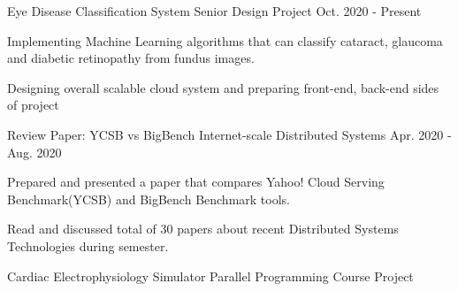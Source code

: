 
\begin{cventries}

  \cvopenentry
   {Eye Disease Classification System} %
    {Senior Design Project} %
    {} %
    {Oct. 2020 - Present} %
    {
      \begin{cvitems} %
      	\item {Implementing Machine Learning algorithms that can classify cataract, glaucoma and diabetic retinopathy from fundus images.}
      	\item {Designing overall scalable cloud system and preparing front-end, back-end sides of project  }
      \end{cvitems}
    }
\cvopenentry
   {Review Paper: YCSB vs BigBench} %
    {Internet-scale Distributed Systems} %
    {} %
    {Apr. 2020 - Aug. 2020} %
    {
      \begin{cvitems} %
        \item {Prepared and presented a paper that compares Yahoo! Cloud Serving Benchmark(YCSB) and         BigBench Benchmark tools.}
      	\item {Read and discussed total of 30 papers about recent Distributed Systems Technologies during semester.}
      \end{cvitems}
    }
\cvopenentry
   {Cardiac Electrophysiology Simulator} %
    {Parallel Programming Course Project} %

\end{cventries}
